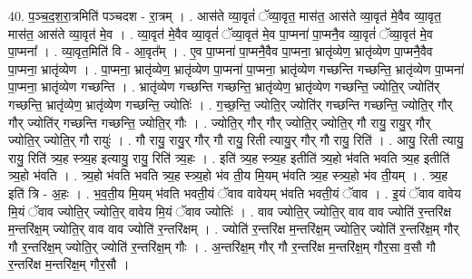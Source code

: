 \documentclass[17pt]{extarticle}
\begin{document}
40. प॒ञ्च॒द॒श॒रा॒त्रमिति॑ पञ्चदश - रा॒त्रम् । . आस॑ते व्या॒वृतं॑ ॅव्या॒वृत॒ मास॑त॒ आस॑ते व्या॒वृत॑ मे॒वैव व्या॒वृत॒ मास॑त॒ आस॑ते व्या॒वृत॑ मे॒व । . व्या॒वृत॑ मे॒वैव व्या॒वृतं॑ ॅव्या॒वृत॑ मे॒व पा॒प्मना॑ पा॒प्मनै॒व व्या॒वृतं॑ ॅव्या॒वृत॑ मे॒व पा॒प्मना᳚ । . व्या॒वृत॒मिति॑ वि - आ॒वृत᳚म् । . ए॒व पा॒प्मना॑ पा॒प्मनै॒वैव पा॒प्मना॒ भ्रातृ॑व्येण॒ भ्रातृ॑व्येण पा॒प्मनै॒वैव पा॒प्मना॒ भ्रातृ॑व्येण । . पा॒प्मना॒ भ्रातृ॑व्येण॒ भ्रातृ॑व्येण पा॒प्मना॑ पा॒प्मना॒ भ्रातृ॑व्येण गच्छन्ति गच्छन्ति॒ भ्रातृ॑व्येण पा॒प्मना॑ पा॒प्मना॒ भ्रातृ॑व्येण गच्छन्ति । . भ्रातृ॑व्येण गच्छन्ति गच्छन्ति॒ भ्रातृ॑व्येण॒ भ्रातृ॑व्येण गच्छन्ति॒ ज्योति॒र् ज्योति॑र् गच्छन्ति॒ भ्रातृ॑व्येण॒ भ्रातृ॑व्येण गच्छन्ति॒ ज्योतिः॑ । . ग॒च्छ॒न्ति॒ ज्योति॒र् ज्योति॑र् गच्छन्ति गच्छन्ति॒ ज्योति॒र् गौर् गौर् ज्योति॑र् गच्छन्ति गच्छन्ति॒ ज्योति॒र् गौः । . ज्योति॒र् गौर् गौर् ज्योति॒र् ज्योति॒र् गौ रायु॒ रायु॒र् गौर् ज्योति॒र् ज्योति॒र् गौ रायुः॑ । . गौ रायु॒ रायु॒र् गौर् गौ रायु॒ रिती त्यायु॒र् गौर् गौ रायु॒ रिति॑ । . आयु॒ रिती त्यायु॒ रायु॒ रिति॑ त्र्य॒ह स्त्र्य॒ह इत्यायु॒ रायु॒ रिति॑ त्र्य॒हः । . इति॑ त्र्य॒ह स्त्र्य॒ह इतीति॑ त्र्य॒हो भ॑वति भवति त्र्य॒ह इतीति॑ त्र्य॒हो भ॑वति । . त्र्य॒हो भ॑वति भवति त्र्य॒ह स्त्र्य॒हो भ॑व ती॒य मि॒यम् भ॑वति त्र्य॒ह स्त्र्य॒हो भ॑व ती॒यम् । . त्र्य॒ह इति॑ त्रि - अ॒हः । . भ॒व॒ती॒य मि॒यम् भ॑वति भवती॒यं ॅवाव वावेयम् भ॑वति भवती॒यं ॅवाव । . इ॒यं ॅवाव वावेय मि॒यं ॅवाव ज्योति॒र् ज्योति॒र् वावेय मि॒यं ॅवाव ज्योतिः॑ । . वाव ज्योति॒र् ज्योति॒र् वाव वाव ज्योति॑ र॒न्तरि॑क्ष म॒न्तरि॑क्ष॒म् ज्योति॒र् वाव वाव ज्योति॑ र॒न्तरि॑क्षम् । . ज्योति॑ र॒न्तरि॑क्ष म॒न्तरि॑क्ष॒म् ज्योति॒र् ज्योति॑ र॒न्तरि॑क्ष॒म् गौर् गौ र॒न्तरि॑क्ष॒म् ज्योति॒र् ज्योति॑ र॒न्तरि॑क्ष॒म् गौः । . अ॒न्तरि॑क्ष॒म् गौर् गौ र॒न्तरि॑क्ष म॒न्तरि॑क्ष॒म् गौर॒सा व॒सौ गौ र॒न्तरि॑क्ष म॒न्तरि॑क्ष॒म् गौर॒सौ । \newline
\pagebreak
{}
\end{document}
